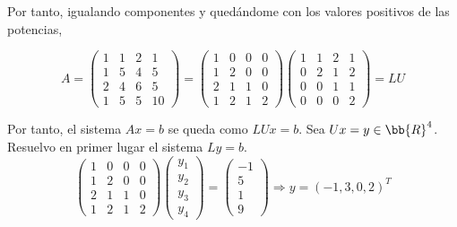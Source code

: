 \begin{ejercicio}
    Por tanto, igualando componentes y quedándome con los valores positivos de las potencias,
    
    \begin{equation*}
            A = \left( \begin{array}{cccc}
        1 & 1 & 2 & 1 \\
        1 & 5 & 4 & 5 \\
        2 & 4 & 6 & 5 \\
        1 & 5 & 5 & 10
    \end{array} \right) = \left( \begin{array}{cccc}
        1 & 0 & 0 & 0 \\
        1 & 2 & 0 & 0 \\
        2 & 1 & 1 & 0 \\
        1 & 2 & 1 & 2
    \end{array} \right)
    \left( \begin{array}{cccc}
        1 & 1 & 2 & 1 \\
        0 & 2 & 1 & 2 \\
        0 & 0 & 1 & 1 \\
        0 & 0 & 0 & 2
    \end{array} \right) = LU
    \end{equation*}

    Por tanto, el sistema $Ax=b$ se queda como $LUx = b$. Sea $Ux = y \in \bb{R}^4$. Resuelvo en primer lugar el sistema $Ly=b$.
    \begin{equation*}
        \left( \begin{array}{cccc}
        1 & 0 & 0 & 0 \\
        1 & 2 & 0 & 0 \\
        2 & 1 & 1 & 0 \\
        1 & 2 & 1 & 2
    \end{array} \right)
    \left( \begin{array}{c}
        y_1 \\ y_2 \\ y_3 \\y_4
    \end{array} \right) =
    \left( \begin{array}{c}
        -1 \\ 5 \\ 1 \\9
    \end{array} \right) \Longrightarrow y = (-1, 3, 0, 2)^T
    \end{equation*}


\end{ejercicio}
